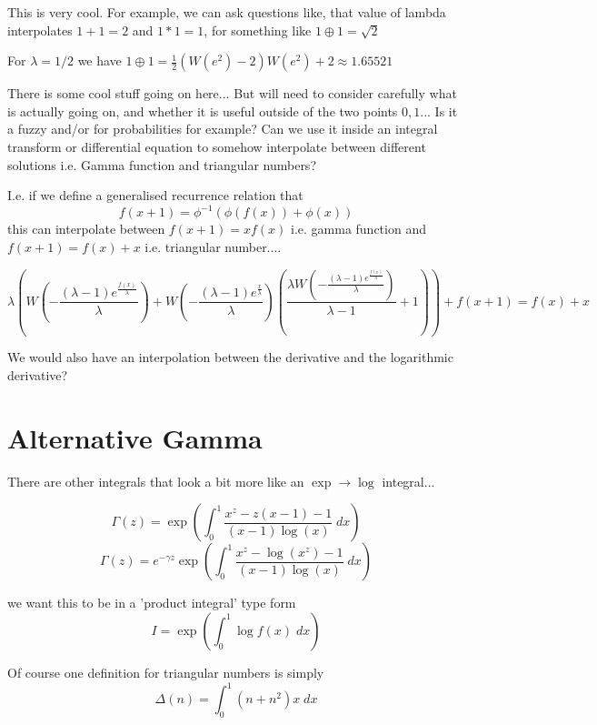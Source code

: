 \documentclass{article}
\begin{document}
This is very cool. For example, we can ask questions like, that value of lambda interpolates $1+1 = 2$ and $1*1 = 1$, for something like $1 \oplus 1 = \sqrt{2}$

For $\lambda = 1/2$ we have $1 \oplus 1 =  \frac{1}{2} \left(W\left(e^2\right)-2\right) W\left(e^2\right)+2 \approx 1.65521$

There is some cool stuff going on here... But will need to consider carefully what is actually going on, and whether it is useful outside of the two points $0,1$... Is it a fuzzy and/or for probabilities for example? Can we use it inside an integral transform or differential equation to somehow interpolate between different solutions i.e. Gamma function and triangular numbers? 

I.e. if we define a generalised recurrence relation that 
$$
f(x + 1) = \phi^{-1}( \phi(f(x)) + \phi(x)) 
$$
this can interpolate between $f(x+1) = x f(x)$ i.e. gamma function and $f(x+1) = f(x) + x$ i.e. triangular number.... 

$$
\lambda  \left(W\left(-\frac{(\lambda -1) e^{\frac{f(x)}{\lambda }}}{\lambda }\right)+W\left(-\frac{(\lambda -1) e^{\frac{x}{\lambda }}}{\lambda }\right) \left(\frac{\lambda  W\left(-\frac{(\lambda -1) e^{\frac{f(x)}{\lambda }}}{\lambda
    }\right)}{\lambda -1}+1\right)\right)+f(x+1)=f(x)+x
$$
    
We would also have an interpolation between the derivative and the logarithmic derivative?

\section{Alternative Gamma}
There are other integrals that look a bit more like an $\exp \to \log$ integral...

$$
\Gamma(z) = \exp\left(\int_0^1 \frac{x^z-z(x-1)-1}{(x-1)\log(x)} \; dx\right)
$$
$$
\Gamma(z) = e^{-\gamma z}\exp\left(\int_0^1 \frac{x^z-\log(x^z)-1}{(x-1)\log(x)} \; dx\right)
$$

we want this to be in a 'product integral' type form
$$
I = \exp\left(\int_0^1 \log f(x) \; dx\right)
$$

Of course one definition for triangular numbers is simply 
$$
\Delta(n) = \int_0^1 (n+n^2)x \; dx
$$



{}

\end{document}
